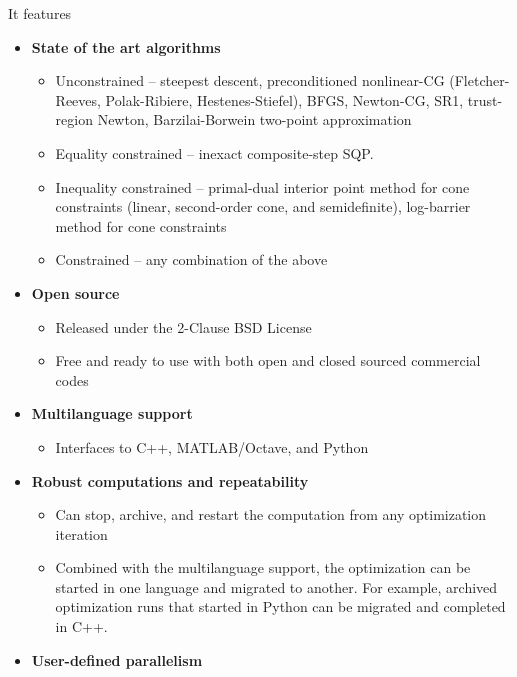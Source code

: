 \documentclass{report}
\begin{document}
\begin{center}
    \usebox{\boxOptimizationTypes}
\end{center}
\noindent It features
\begin{itemize}
    \item {\bf State of the art algorithms}
        \begin{itemize}
            \item Unconstrained -- steepest descent, preconditioned nonlinear-CG (Fletcher-Reeves, Polak-Ribiere, Hestenes-Stiefel), BFGS, Newton-CG, SR1, trust-region Newton, Barzilai-Borwein two-point approximation
            \item Equality constrained -- inexact composite-step SQP.
            \item Inequality constrained -- primal-dual interior point method for cone constraints (linear, second-order cone, and semidefinite), log-barrier method for cone constraints
            \item Constrained -- any combination of the above
        \end{itemize}
    \item {\bf Open source}
        \begin{itemize}
            \item Released under the 2-Clause BSD License
            \item Free and ready to use with both open and closed sourced commercial codes
        \end{itemize}
    \item {\bf Multilanguage support}
        \begin{itemize}
            \item Interfaces to C++, MATLAB/Octave, and Python
        \end{itemize}
    \item {\bf Robust computations and repeatability}
        \begin{itemize}
            \item Can stop, archive, and restart the computation from any optimization iteration
            \item Combined with the multilanguage support, the optimization can be started in one language and migrated to another.  For example, archived optimization runs that started in Python can be migrated and completed in C++.
        \end{itemize}
    \item {\bf User-defined parallelism}
        \begin{itemize}

\end{itemize}
\end{itemize}
\end{document}
